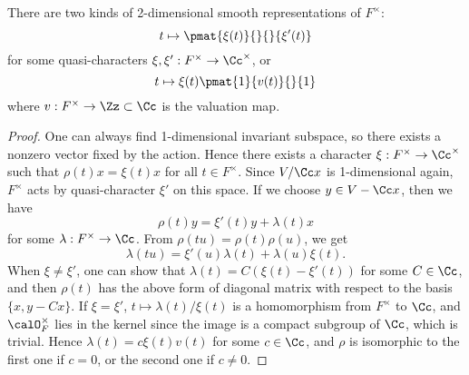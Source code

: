 \begin{proposition}
There are two kinds of 2-dimensional smooth representations of $F^{\times}$:
$$
t\mapsto \pmat{\xi(t)}{}{}{\xi'(t)}
$$
for some quasi-characters $\xi, \xi':F^{\times} \to \Cc^{\times}$, or 
$$
t\mapsto \xi(t) \pmat{1}{v(t)}{}{1}
$$
where $v:F^{\times}\to \Zz\subset \Cc$ is the valuation map. 
\end{proposition}
\begin{proof}
One can always find 1-dimensional invariant subspace, so there exists a nonzero vector fixed by the action. Hence there exists a character $\xi:F^{\times} \to \Cc^{\times}$ such that $\rho(t)x = \xi(t)x$ for all $t\in F^{\times}$. 
Since $V/\Cc x$ is 1-dimensional again, $F^{\times}$ acts by quasi-character $\xi'$ on this space. 
If we choose $y\in V - \Cc x$, then we have
$$
\rho(t)y = \xi'(t)y + \lambda(t)x
$$
for some $\lambda:F^{\times} \to \Cc$. From $\rho(tu) = \rho(t)\rho(u)$, we get
$$
\lambda(tu) = \xi'(u)\lambda(t) + \lambda(u)\xi(t).
$$
When $\xi\neq \xi'$, one can show that $\lambda(t) = C(\xi(t) - \xi'(t))$ for some $C\in \Cc$, and then $\rho(t)$ has the above form of diagonal matrix with respect to the basis $\{x, y - Cx\}$. 
If $\xi = \xi'$, $t\mapsto \lambda(t)/\xi(t)$ is a homomorphism from $F^{\times}$ to $\Cc$, and $\calO_F^{\times}$ lies in the kernel since the image is a compact subgroup of $\Cc$, which is trivial. 
Hence $\lambda(t) = c\xi(t)v(t)$ for some $c\in \Cc$, and $\rho$ is isomorphic to the first one if $c =0$, or the second one if $c\neq 0$. 
\end{proof}

